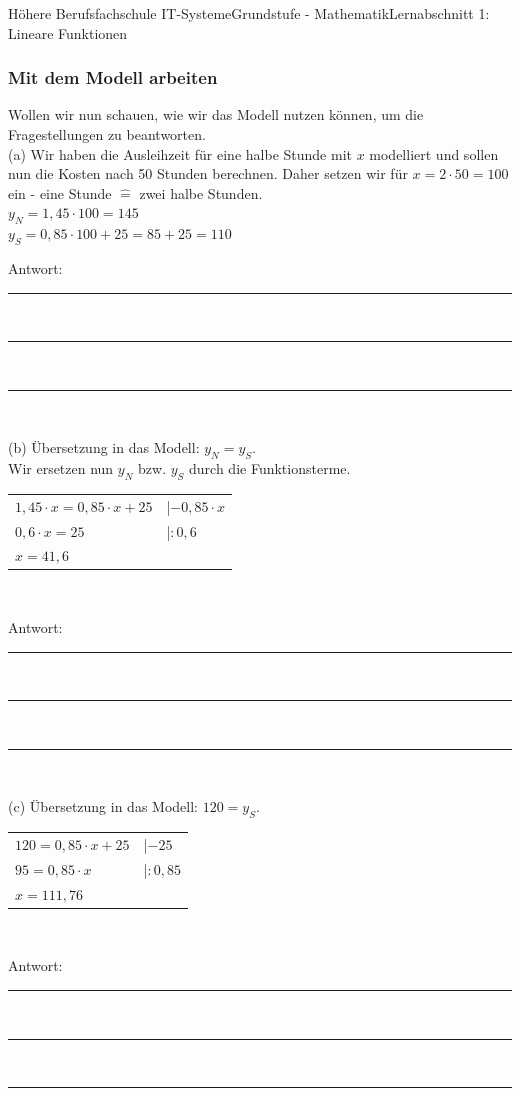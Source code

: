 \documentclass[11pt,twocolumn,oneside,openany,headings=optiontotoc,11pt,numbers=noenddot]{article}
\begin{document}
\begin{worksheet}{Höhere Berufsfachschule IT-Systeme}{Grundstufe - 
		Mathematik}{Lernabschnitt 1: Lineare Funktionen}
		\subsubsection{Mit dem Modell arbeiten}
		Wollen wir nun schauen, wie wir das Modell nutzen können, um die Fragestellungen zu beantworten.\\
		(a) Wir haben die Ausleihzeit für eine halbe Stunde mit \(x\) modelliert und sollen nun die Kosten nach 50 Stunden berechnen. Daher setzen wir für \(x = 2\cdot{}50 = 100\) ein - eine Stunde \(\widehat{=}\) zwei halbe Stunden.\\
		\(y_N = 1,45\cdot{}100 = 145\)\\
		\(y_S = 0,85\cdot{}100 + 25 = 85+25 = 110\)\\
		\par\noindent
		Antwort: \rule{0.36\textwidth}{0.1pt}\\
		\par\bigskip\noindent
		\rule{0.45\textwidth}{0.1pt}\\
		\par\bigskip\noindent
		\rule{0.45\textwidth}{0.1pt}\\
		\par\noindent
		(b) Übersetzung in das Modell: \(y_N = y_S\).\\
		Wir ersetzen nun \(y_N\) bzw. \(y_S\) durch die Funktionsterme.\\
		\begin{tabularx}{0.5\textwidth}{ll}
			\(1,45\cdot{}x = 0,85\cdot{}x + 25\) & |\(-0,85\cdot{}x\)\\
			\(0,6\cdot{}x = 25\) & |\(:0,6\)\\
			\(x = 41,6\)
		\end{tabularx}\\
		\par\noindent
		Antwort: \rule{0.36\textwidth}{0.1pt}\\
		\par\bigskip\noindent
		\rule{0.45\textwidth}{0.1pt}\\
		\par\bigskip\noindent
		\rule{0.45\textwidth}{0.1pt}\\
		\par\noindent
		(c) Übersetzung in das Modell: \(120 = y_S\).\\
		\begin{tabularx}{0.5\textwidth}{ll}
			\(120 = 0,85\cdot{}x + 25\) & |\(-25\)\\
			\(95 = 0,85\cdot{}x\) & |\(:0,85\)\\
			\(x = 111,76\)
		\end{tabularx}\\
		\par\noindent
		Antwort: \rule{0.36\textwidth}{0.1pt}\\
		\par\bigskip\noindent
		\rule{0.45\textwidth}{0.1pt}\\
		\par\bigskip\noindent
		\rule{0.45\textwidth}{0.1pt}\\
		\par\noindent
	\end{worksheet}
\end{document}
